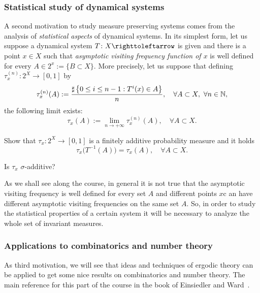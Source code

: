 \subsubsection{Statistical study of dynamical systems}\label{sec:statical-study-dyn-sys}

A second motivation to study measure preserving systems comes from the analysis of \emph{statistical aspects} of dynamical systems. In its simplest form, let us suppose a dynamical system $T\colon X\carr$ is given and there is a point $x\in X$ such that \emph{asymptotic visiting frequency function of $x$} is well defined for every $A\in 2^x:=\{B\subset X\}$. More precisely, let us suppose that defining $\tau_{x}^{(n)}\colon 2^X\to [0,1]$ by
\begin{displaymath}
  \tau_{x}^{(n)}(A):=\frac{\sharp\left\{0\leq i\leq n-1 : T^{i}(x)\in A\right\}}{n}, \quad\forall A\subset X,\ \forall n\in\mathbb{N},
\end{displaymath}
the following limit exists:
\begin{displaymath}
  \tau_x(A):=\lim_{n\to+\infty}\tau_x^{(n)}(A), \quad\forall A\subset X.
\end{displaymath}

\begin{exercise}
  Show that $\tau_x\colon 2^X\to[0,1]$ is a finitely additive probability measure and it holds
  \begin{displaymath}
    \tau_x\big(T^{-1}(A)\big)=\tau_x(A), \quad\forall A\subset X.
  \end{displaymath}

  Is $\tau_x$ $\sigma$-additive?
\end{exercise}

As we shall see along the course, in general it is not true that the asymptotic visiting frequency is well defined for every set $A$ and different points $x$c an have different asymptotic visiting frequencies on the same set $A$. So, in order to study the statistical properties of a certain system it will be necessary to analyze the whole set of invariant measures.


\subsubsection{Applications to combinatorics and number theory}\label{sec:appl-combinatorics-number-theory}

As third motivation, we will see that ideas and techniques of ergodic theory can be applied to get some nice results on combinatorics and number theory. The main reference for this part of the course in the book of Einsiedler and Ward~\cite{EinsiedlerWardErgThViewNumbTh}.


